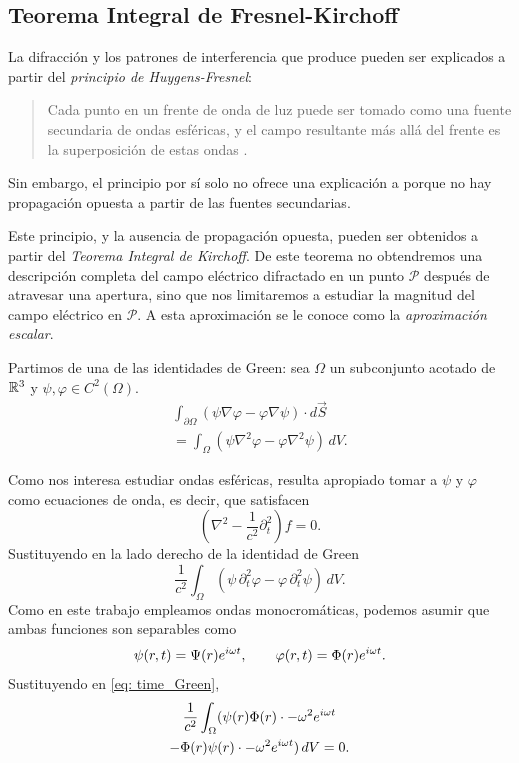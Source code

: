 \begin{multicols}{2}
\section{Teorema Integral de Fresnel-Kirchoff}\label{sec: teo}

La difracción y los patrones de interferencia que produce pueden ser explicados a partir del \emph{principio de Huygens-Fresnel}:
\begin{quote}
	Cada punto en un frente de onda de luz puede ser tomado como una fuente secundaria de ondas esféricas, y el campo resultante más allá del frente es la superposición de estas ondas \parencite{pedrotti}.
\end{quote}

Sin embargo, el principio por sí solo no ofrece una explicación a porque no hay propagación opuesta a partir de las fuentes secundarias.

Este principio, y la ausencia de propagación opuesta, pueden ser obtenidos a partir del \emph{Teorema Integral de Kirchoff}. De este teorema no obtendremos una descripción completa del campo eléctrico difractado en un punto $\mathcal P$ después de atravesar una apertura, sino que nos limitaremos a estudiar la magnitud del campo eléctrico en $\mathcal P$. A esta aproximación se le conoce como la \textit{aproximación escalar}\parencite{fowles-1989}.

Partimos de una de las identidades de Green: sea $\Omega$ un subconjunto acotado de $\mathbb R^3$ y $\psi, \varphi \in C^2(\Omega)$.
\begin{multline}
	\int_{\partial \Omega} (\psi \nabla \varphi - \varphi \nabla \psi) \cdot d\vec S \\
	= \int_{\Omega} (\psi \nabla^2 \varphi - \varphi \nabla^2 \psi) \, dV.
\end{multline}

Como nos interesa estudiar ondas esféricas, resulta apropiado tomar a $\psi$ y $\varphi$ como ecuaciones de onda, es decir, que satisfacen
\begin{equation}
	\left (\nabla^2  - \frac{1}{c^2} \partial_t^2\right ) f = 0.
\end{equation}
Sustituyendo en la lado derecho de la identidad de Green
\begin{equation}\label{eq: time_Green}
	\frac{1}{c^2} \int_{\Omega} (\psi \, \partial_t^2 \varphi - \varphi  \,\partial_t^2 \psi) \, dV.
\end{equation}
Como en este trabajo empleamos ondas monocromáticas, podemos asumir que ambas funciones son separables como
\begin{equation}
	\psi(r, t) = \Psi(r) e^{i\omega t}, \qquad \varphi(r, t) = \Phi(r) e^{i\omega t}.
\end{equation}
Sustituyendo en \eqref{eq: time_Green},
\begin{multline}
	\frac{1}{c^2} \int_{\Omega} (\psi(r)\Phi(r) \cdot -\omega^2 e^{i\omega t}\\
	 - \Phi(r)\psi(r) \cdot -\omega^2 e^{i\omega t}) \, dV = 0.
\end{multline}


\end{multicols}
